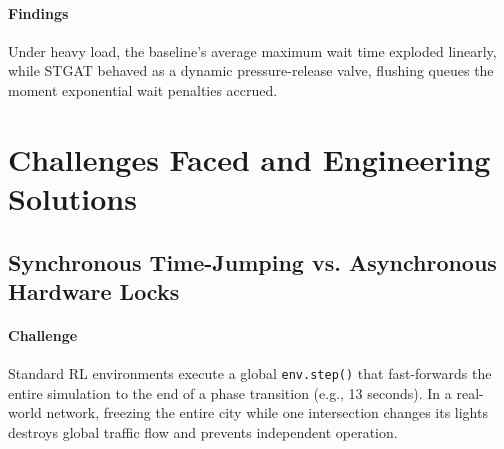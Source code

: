 \documentclass[12pt, onecolumn]{IEEEtran}
\begin{document}
\paragraph{Findings} Under heavy load, the baseline's average maximum wait time exploded linearly, while STGAT behaved as a dynamic pressure-release valve, flushing queues the moment exponential wait penalties accrued.

\section{Challenges Faced and Engineering Solutions}

\subsection{Synchronous Time-Jumping vs. Asynchronous Hardware Locks}
\paragraph{Challenge} Standard RL environments execute a global \texttt{env.step()} that fast-forwards the entire simulation to the end of a phase transition (e.g., 13 seconds). In a real-world network, freezing the entire city while one intersection changes its lights destroys global traffic flow and prevents independent operation. \\
\end{document}

